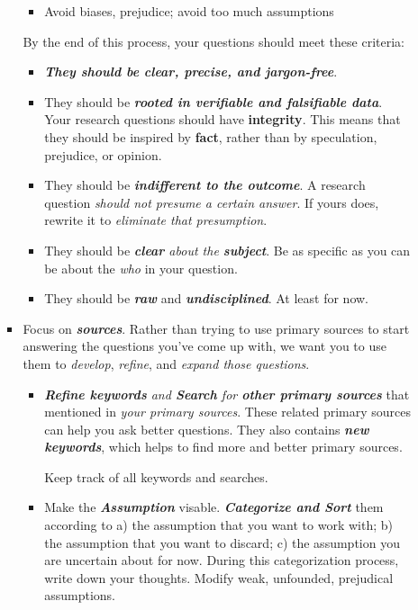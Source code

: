 \documentclass[11pt]{article}
\begin{document}
\begin{itemize}
\begin{enumerate}
\begin{itemize}
\begin{itemize}
\item Avoid biases, prejudice; avoid too much assumptions
\end{itemize}

By the end of this process, your questions should meet these criteria:
\begin{itemize}
\item \textbf{\emph{They should be clear, precise, and jargon-free}}. 

\item They should be \textbf{\emph{rooted in verifiable and falsifiable data}}. Your research questions should have \textbf{integrity}. This means that they should be inspired by \textbf{fact}, rather than by speculation, prejudice, or opinion. 

\item They should be \emph{\textbf{indifferent to the outcome}}. A research question \emph{should not presume a certain answer}. If yours does, rewrite it to \emph{eliminate that presumption}.

\item They should be \emph{\textbf{clear} about the \textbf{subject}}. Be as specific as you can be about the \emph{who} in your question.

\item They should be \emph{\textbf{raw}} and \emph{\textbf{undisciplined}}. At least for now.
\end{itemize}

\item Focus on \emph{\textbf{sources}}. Rather than trying to use primary sources to start answering the questions you’ve come up with, we want you to use them to \emph{develop}, \emph{refine}, and \emph{expand those questions}. 
\begin{itemize}
\item \emph{\textbf{Refine keywords} and \textbf{Search} for \textbf{other primary sources}} that mentioned in \emph{your primary sources}. These related primary sources can help you ask better questions. They also contains \emph{\textbf{new keywords}}, which helps to find more and better primary sources.

Keep track of all keywords and searches. 

\item Make the \emph{\textbf{Assumption}} visable. \emph{\textbf{Categorize and Sort}} them according to a) the assumption that you want to work with; b) the assumption that you want to discard; c) the assumption you are uncertain about for now. During this categorization process, write down your thoughts. Modify weak, unfounded, prejudical assumptions.
\end{itemize}
\end{itemize}


\end{enumerate}
\end{itemize}
\end{document}
